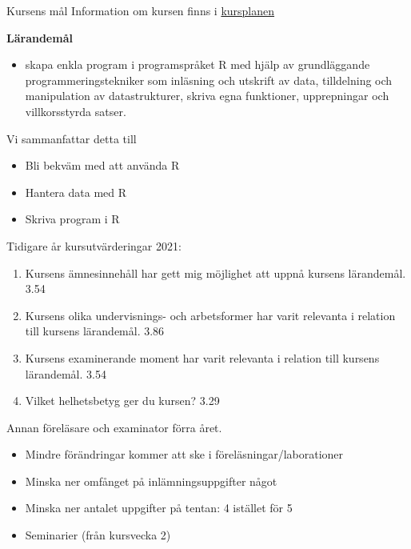 \documentclass[
  10pt,
  ignorenonframetext,
]{beamer}
\providecommand{\tightlist}{%
  \setlength{\itemsep}{0pt}\setlength{\parskip}{0pt}}
\begin{document}
\begin{frame}{Kursens mål}
\protect\hypertarget{kursens-muxe5l}{}
Information om kursen finns i \href{https://studieinfo.liu.se/kurs/732G33/vt-2023}{kursplanen}

\textbf{Lärandemål}

\begin{itemize}
\tightlist
\item
  skapa enkla program i programspråket R med hjälp av grundläggande
  programmeringstekniker som inläsning och utskrift av data, tilldelning
  och manipulation av datastrukturer, skriva egna funktioner,
  upprepningar och villkorsstyrda satser.
\end{itemize}

\pause Vi sammanfattar detta till

\begin{itemize}
\tightlist
\item
  Bli bekväm med att använda R
\item
  Hantera data med R
\item
  Skriva program i R
\end{itemize}
\end{frame}


\begin{frame}{Tidigare år}
\protect\hypertarget{tidigare-uxe5r}{}
kursutvärderingar 2021:

\begin{enumerate}
\tightlist
\item
  Kursens ämnesinnehåll har gett mig möjlighet att uppnå kursens
  lärandemål. 3.54
\item
  Kursens olika undervisnings- och arbetsformer har varit relevanta i relation till
kursens lärandemål. 3.86
\item
  Kursens examinerande moment har varit relevanta i relation till
  kursens lärandemål. 3.54
\item
  Vilket helhetsbetyg ger du kursen? 3.29
\end{enumerate}

Annan föreläsare och examinator förra året.
\begin{itemize}
\tightlist
\item
  Mindre förändringar kommer att ske i
föreläsningar/laborationer
\item
  Minska ner omfånget på inlämningsuppgifter något
\item
  Minska ner antalet uppgifter på tentan:  4 istället för 5
\item
  Seminarier (från kursvecka 2)
\end{itemize}


\end{frame}
\end{document}
